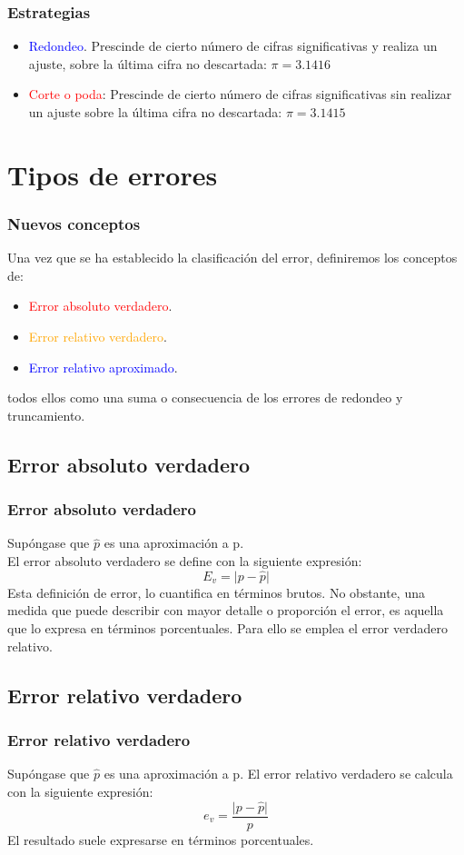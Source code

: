 \begin{frame}
\frametitle{Estrategias}
\begin{itemize}[<+->]
\item \textcolor{blue}{Redondeo}. Prescinde de cierto número de cifras significativas y realiza un ajuste, sobre la última cifra no descartada: $\pi = 3.1416$
\item \textcolor{red}{Corte o poda}: Prescinde de cierto número de cifras significativas sin realizar un ajuste sobre la última cifra no descartada: $\pi = 3.1415$
\end{itemize}
\end{frame}
\section{Tipos de errores}
\begin{frame}
\frametitle{Nuevos conceptos}
Una vez que se ha establecido la clasificación del error, definiremos los conceptos de:
\begin{itemize}
\item \textcolor{red}{Error absoluto verdadero}.
\item \textcolor{orange}{Error relativo verdadero}.
\item \textcolor{blue}{Error relativo aproximado}.
\end{itemize}
todos ellos como una suma o consecuencia de los errores de redondeo y truncamiento.
\end{frame}
\subsection{Error absoluto verdadero}
\begin{frame}
\frametitle{Error absoluto verdadero}
Supóngase que $\widehat{p}$ es una aproximación a p.
\\
\bigskip
El error absoluto verdadero se define con la siguiente expresión:
\[ E_{v} = \vert p - \widehat{p} \vert \]
Esta definición de error, lo cuantifica en términos brutos. No obstante, una medida que puede describir con mayor detalle o proporción el error, es aquella que lo expresa en términos porcentuales. Para ello se emplea el error verdadero relativo.
\end{frame}
\subsection{Error relativo verdadero}
\begin{frame}
\frametitle{Error relativo verdadero}
Supóngase que $\widehat{p}$ es una aproximación a p. El error relativo verdadero se calcula con la siguiente expresión:
\[ e_{v} = \dfrac{\vert p - \widehat{p} \vert }{p}\]
El resultado suele expresarse en términos porcentuales.
\end{frame}

